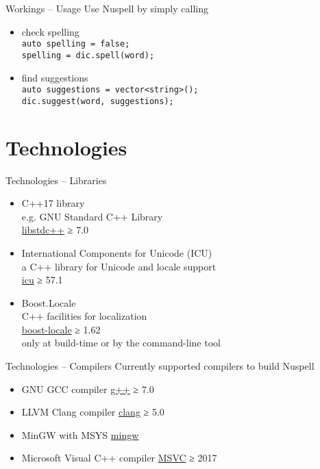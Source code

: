 \documentclass{beamer}
\begin{document}
\begin{frame}{Workings – Usage}
Use Nuspell by simply calling \\\mbox{}
\begin{itemize}
\item check spelling\\
\texttt{auto spelling = false;\\
spelling = dic.\alert{spell}(word);}
\\\mbox{}
\item find suggestions\\
\texttt{auto suggestions = vector<string>();\\
dic.\alert{suggest}(word, suggestions);}
\end{itemize}
\end{frame}



\section{Technologies}

\begin{frame}{Technologies – Libraries}
\begin{itemize}
\item C++17 library\\
e.g. GNU Standard C++ Library\\
\href{https://gcc.gnu.org/}{libstdc++} ≥ 7.0
\\\mbox{}
\item International Components for Unicode (ICU)\\
a C++ library for Unicode and locale support\\
\href{http://site.icu-project.org/}{icu} ≥ 57.1
\\\mbox{}
\item Boost.Locale\\
C++ facilities for localization\\
\href{https://www.boost.org/doc/libs/1_69_0/libs/locale/doc/html/index.html}{boost-locale} ≥ 1.62\\
only at build-time or by the command-line tool
\end{itemize}
\end{frame}

\begin{frame}{Technologies – Compilers}
Currently supported compilers to build Nuspell
\begin{itemize}
\item GNU GCC compiler \href{https://gcc.gnu.org/}{g++} ≥ 7.0
\item LLVM Clang compiler \href{https://clang.llvm.org/}{clang} ≥ 5.0
\item MinGW with MSYS \href{http://mingw.org/}{mingw}
\item Microsoft Visual C++ compiler \href{https://docs.microsoft.com/en-us/cpp/}{MSVC} ≥ 2017
\end{itemize}
\end{frame}
\end{document}
